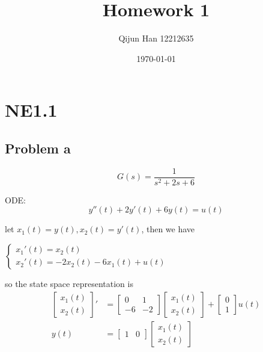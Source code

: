 \documentclass[12pt,a4paper]{article}
\title{Homework 1} %
\author{Qijun Han 12212635}
\date{\today}
\begin{document}
\maketitle

\section{NE1.1}
\subsection*{Problem a}

\[G(s) = \frac{1}{s^2+2s+6}\]

ODE:
\[y''(t) + 2y'(t) + 6y(t) = u(t)\]

let $x_1(t) = y(t), x_2(t) = y'(t)$, then we have

$\begin{cases}
    x_1'(t) = x_2(t) \\
    x_2'(t) = -2x_2(t) - 6x_1(t) + u(t)
\end{cases}
$

so the state space representation is
\begin{equation}
    \begin{aligned}
        \begin{bmatrix}
            {x_1(t)} \\
            {x_2(t)}
        \end{bmatrix}' & = \begin{bmatrix}
                               0  & 1  \\
                               -6 & -2
                           \end{bmatrix} \begin{bmatrix}
                                             x_1(t) \\
                                             x_2(t)
                                         \end{bmatrix} + \begin{bmatrix}
                                                             0 \\
                                                             1
                                                         \end{bmatrix} u(t) \\
        y(t)               & = \begin{bmatrix}
                                1 & 0
                            \end{bmatrix} \begin{bmatrix}
                                              x_1(t) \\
                                              x_2(t)
                                          \end{bmatrix}
    \end{aligned}
\end{equation}
\end{document}
